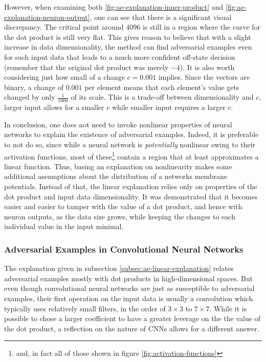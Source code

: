 \documentclass[11pt, a4paper]{article}
\begin{document}
However, when examining both \ref{fig:ae-explanation-inner-product} and \ref{fig:ae-explanation-neuron-output}, one can see that there is a significant visual discrepancy. The critical point around $4096$ is still in a region where the curve for the dot product is still very flat. This gives reason to believe that with a slight increase in data dimensionality, the method can find adversarial examples even for such input data that leads to a much more confident off-state decision (remember that the original dot product was merely $-4$). It is also worth considering just how small of a change $c = 0.001$ implies. Since the vectors are binary, a change of $0.001$ per element means that each element's value gets changed by only $\frac{1}{1000}$ of its scale. This is a trade-off between dimensionality and $c$, larger input allows for a smaller $c$ while smaller input requires a larger $c$.

In conclusion, one does not need to invoke nonlinear properties of neural networks to explain the existence of adversarial examples. Indeed, it is preferable to not do so, since while a neural network is \emph{potentially} nonlinear owing to their activation functions, most of these\footnote{and, in fact all of those shown in figure \ref{fig:activation-functions}} contain a region that at least approximates a linear function. Thus, basing an explanation on nonlinearity makes some additional assumptions about the distribution of a networks membrane potentials. Instead of that, the linear explanation relies only on properties of the dot product and input data dimensionality. It was demonstrated that it becomes easier and easier to tamper with the value of a dot product, and hence with neuron outputs, as the data size grows, while keeping the changes to each individual value in the input minimal.

\subsubsection{Adversarial Examples in Convolutional Neural Networks}
The explanation given in subsection \ref{subsec:ae-linear-explanation} relates adversarial examples mostly with dot products in high-dimensional spaces. But even though convolutional neural networks are just as susceptible to adversarial examples, their first operation on the input data is usually a convolution which typically uses relatively small filters, in the order of $3 \times 3$ to $7 \times 7$. While it is possible to chose a larger coefficient to have a greater leverage on the the value of the dot product, a reflection on the nature of CNNs allows for a different answer.
\end{document}
